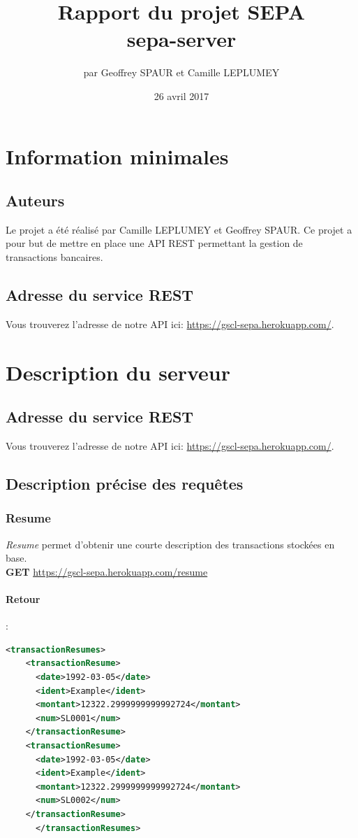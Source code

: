 \documentclass{article}
\title{Rapport du projet SEPA \\ sepa-server}
\author{par Geoffrey SPAUR et Camille LEPLUMEY}
\date{26 avril 2017}
\begin{document}
  \maketitle
  \newpage
  \tableofcontents{}
  \newpage
  
  \section{Information minimales}
    \subsection{Auteurs}
      Le projet a été réalisé par Camille LEPLUMEY et Geoffrey SPAUR. Ce projet a pour but de mettre en place une API REST 
      permettant la gestion de transactions bancaires.
    \subsection{Adresse du service REST}
      Vous trouverez l’adresse de notre API ici: \url{https://gscl-sepa.herokuapp.com/}.
  \newpage

  \section{Description du serveur}
    \subsection{Adresse du service REST}
      Vous trouverez l’adresse de notre API ici: \url{https://gscl-sepa.herokuapp.com/}.
    \subsection{Description précise des requêtes}
      \subsubsection{Resume}
	\emph{Resume} permet d'obtenir une courte description des transactions stockées en base.\\
	\textbf{GET} \url{https://gscl-sepa.herokuapp.com/resume}
	\paragraph{Retour}:
	  \begin{lstlisting}[language=xml]
      <transactionResumes>
	<transactionResume>
	  <date>1992-03-05</date>
	  <ident>Example</ident>
	  <montant>12322.2999999999992724</montant>
	  <num>SL0001</num>
	</transactionResume>
	<transactionResume>
	  <date>1992-03-05</date>
	  <ident>Example</ident>
	  <montant>12322.2999999999992724</montant>
	  <num>SL0002</num>
	</transactionResume>
      </transactionResumes>
	    \end{lstlisting}
\end{document}
